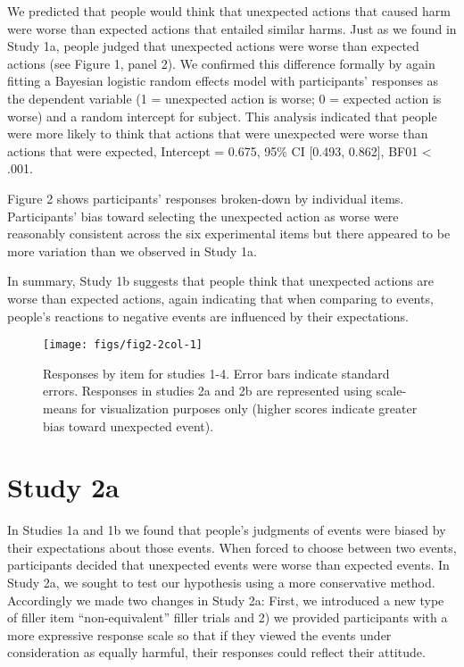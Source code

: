 \documentclass[10pt, letterpaper]{article}
\newenvironment{CodeChunk}{}{}
\begin{document}
We predicted that people would think that unexpected actions that caused
harm were worse than expected actions that entailed similar harms. Just
as we found in Study 1a, people judged that unexpected actions were
worse than expected actions (see Figure 1, panel 2). We confirmed this
difference formally by again fitting a Bayesian logistic random effects
model with participants' responses as the dependent variable (1 =
unexpected action is worse; 0 = expected action is worse) and a random
intercept for subject. This analysis indicated that people were more
likely to think that actions that were unexpected were worse than
actions that were expected, Intercept = 0.675, 95\% CI {[}0.493,
0.862{]}, BF01 \textless{} .001.

Figure 2 shows participants' responses broken-down by individual items.
Participants' bias toward selecting the unexpected action as worse were
reasonably consistent across the six experimental items but there
appeared to be more variation than we observed in Study 1a.

In summary, Study 1b suggests that people think that unexpected actions
are worse than expected actions, again indicating that when comparing to
events, people's reactions to negative events are influenced by their
expectations.

\begin{CodeChunk}
\begin{figure*}[h]

{\centering \texttt{[image: figs/fig2-2col-1]} 

}

\caption[Responses by item for studies 1-4]{Responses by item for studies 1-4. Error bars indicate standard errors. Responses in studies 2a and 2b are represented using scale-means for visualization purposes only (higher scores indicate greater bias toward unexpected event).}\label{fig:fig2-2col}
\end{figure*}
\end{CodeChunk}

\section{Study 2a}\label{study-2a}

In Studies 1a and 1b we found that people's judgments of events were
biased by their expectations about those events. When forced to choose
between two events, participants decided that unexpected events were
worse than expected events. In Study 2a, we sought to test our
hypothesis using a more conservative method. Accordingly we made two
changes in Study 2a: First, we introduced a new type of filler item
``non-equivalent'' filler trials and 2) we provided participants with a
more expressive response scale so that if they viewed the events under
consideration as equally harmful, their responses could reflect their
attitude.
\end{document}
